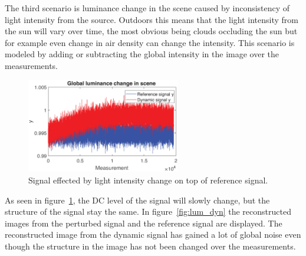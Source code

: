 



The third scenario is luminance change in the scene caused by inconsistency of light intensity from the source. Outdoors this means that the light intensity from the sun will vary over time, the most obvious being clouds occluding the sun but for example even change in air density can change the intensity. This scenario is modeled by adding or subtracting the global intensity in the image over the measurements. 

\begin{figure}[H]
\centering
    \includegraphics[width=0.6\textwidth]{result/dynamic/lum/intense_change1.eps}
    \caption{Signal effected by light intensity change on top of reference signal.}
    \label{fig:lum_sig_1}
\end{figure}

As seen in figure~\ref{fig:lum_sig_1}, the DC level of the signal will slowly change, but the structure of the signal stay the same. In figure~\ref{fig:lum_dyn} the reconstructed images from the perturbed signal and the reference signal are displayed. The reconstructed image from the dynamic signal has gained a lot of global noise even though the structure in the image has not been changed over the measurements.  


